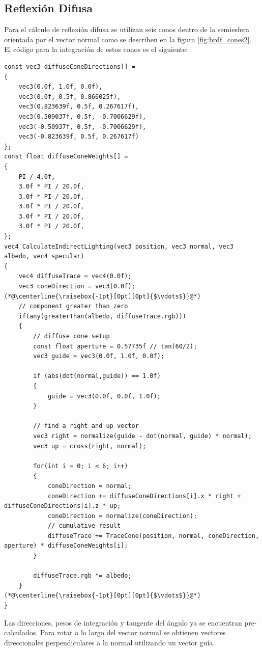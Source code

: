 \subsection{Reflexión Difusa} %
\label{sub:reflexion_difuse}
Para el cálculo de reflexión difusa se utilizan seis conos dentro de la semiesfera orientada por el vector normal como se describen en la figura \ref{fig:brdf_cones2}. El código para la integración de estos conos es el siguiente:
\\
\begin{lstlisting}[caption={Conos para reflexión difusa.}, label=Trace3]
const vec3 diffuseConeDirections[] =
{
    vec3(0.0f, 1.0f, 0.0f),
    vec3(0.0f, 0.5f, 0.866025f),
    vec3(0.823639f, 0.5f, 0.267617f),
    vec3(0.509037f, 0.5f, -0.7006629f),
    vec3(-0.50937f, 0.5f, -0.7006629f),
    vec3(-0.823639f, 0.5f, 0.267617f)
};
const float diffuseConeWeights[] =
{
    PI / 4.0f,
    3.0f * PI / 20.0f,
    3.0f * PI / 20.0f,
    3.0f * PI / 20.0f,
    3.0f * PI / 20.0f,
    3.0f * PI / 20.0f,
};
vec4 CalculateIndirectLighting(vec3 position, vec3 normal, vec3 albedo, vec4 specular)
{
    vec4 diffuseTrace = vec4(0.0f);
    vec3 coneDirection = vec3(0.0f);
(*@\centerline{\raisebox{-1pt}[0pt][0pt]{$\vdots$}}@*)
    // component greater than zero
    if(any(greaterThan(albedo, diffuseTrace.rgb)))
    {
        // diffuse cone setup
        const float aperture = 0.57735f // tan(60/2);
        vec3 guide = vec3(0.0f, 1.0f, 0.0f);

        if (abs(dot(normal,guide)) == 1.0f)
        {
            guide = vec3(0.0f, 0.0f, 1.0f);
        }

        // find a right and up vector
        vec3 right = normalize(guide - dot(normal, guide) * normal);
        vec3 up = cross(right, normal);

        for(int i = 0; i < 6; i++)
        {
            coneDirection = normal;
            coneDirection += diffuseConeDirections[i].x * right + diffuseConeDirections[i].z * up;
            coneDirection = normalize(coneDirection);
            // cumulative result
            diffuseTrace += TraceCone(position, normal, coneDirection, aperture) * diffuseConeWeights[i];
        }

        diffuseTrace.rgb *= albedo;
    }
(*@\centerline{\raisebox{-1pt}[0pt][0pt]{$\vdots$}}@*)
}
\end{lstlisting}
Las direcciones, pesos de integración y tangente del ángulo ya se encuentran pre-calculados. Para rotar a lo largo del vector normal se obtienen vectores direccionales perpendiculares a la normal utilizando un vector guía.
